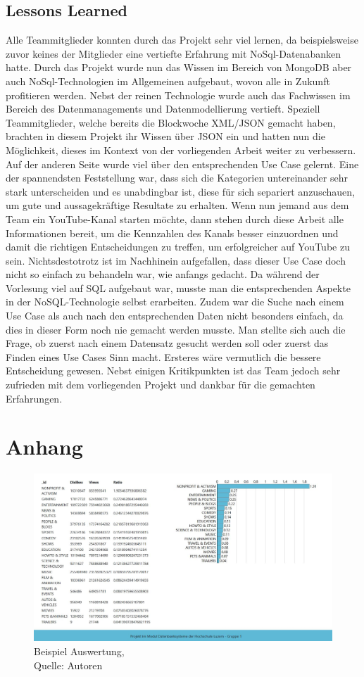 \documentclass[12pt,titlepage]{article}
\begin{document}
\subsection{Lessons Learned}
Alle Teammitglieder konnten durch das Projekt sehr viel lernen, da beispielsweise zuvor keines der Mitglieder eine vertiefte Erfahrung mit NoSql-Datenabanken hatte. Durch das Projekt wurde nun das Wissen im Bereich von MongoDB aber auch NoSql-Technologien im Allgemeinen aufgebaut, wovon alle in Zukunft profitieren werden. Nebst der reinen Technologie wurde auch das Fachwissen im Bereich des Datenmanagements und Datenmodellierung vertieft. Speziell Teammitglieder, welche bereits die Blockwoche XML/JSON gemacht haben, brachten in diesem Projekt ihr Wissen über JSON ein und hatten nun die Möglichkeit, dieses im Kontext von der vorliegenden Arbeit weiter zu verbessern. Auf der anderen Seite wurde viel über den entsprechenden Use Case gelernt. Eine der spannendsten Feststellung war, dass sich die Kategorien untereinander sehr stark unterscheiden und es unabdingbar ist, diese für sich separiert anzuschauen, um gute und aussagekräftige Resultate zu erhalten. Wenn nun jemand aus dem Team ein YouTube-Kanal starten möchte, dann stehen durch diese Arbeit alle Informationen bereit, um die Kennzahlen des Kanals besser einzuordnen und damit die richtigen Entscheidungen zu treffen, um erfolgreicher auf YouTube zu sein. Nichtsdestotrotz ist im Nachhinein aufgefallen, dass dieser Use Case doch nicht so einfach zu behandeln war, wie anfangs gedacht. Da während der Vorlesung viel auf SQL aufgebaut war, musste man die entsprechenden Aspekte in der NoSQL-Technologie selbst erarbeiten. Zudem war die Suche nach einem Use Case als auch nach den entsprechenden Daten nicht besonders einfach, da dies in dieser Form noch nie gemacht werden musste. Man stellte sich auch die Frage, ob zuerst nach einem Datensatz gesucht werden soll oder zuerst das Finden eines Use Cases Sinn macht. Ersteres wäre vermutlich die bessere Entscheidung gewesen. Nebst einigen Kritikpunkten ist das Team jedoch sehr zufrieden mit dem vorliegenden Projekt und dankbar für die gemachten Erfahrungen. 
\newpage

\section{Anhang}
\begin{figure}[h]
	\centering
	\includegraphics[width=16cm]{IMG/Abfrage1.JPG}
	\caption[Beispiel Auswertung]{Beispiel Auswertung,\\ Quelle: Autoren}
	\label{img: Beispiel Auswertung}
\end{figure}
\newpage





\end{document}
